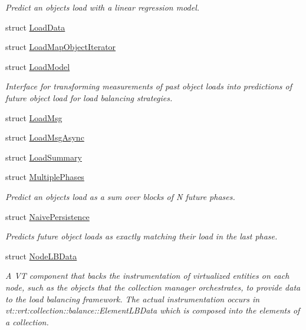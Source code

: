 \begin{DoxyCompactItemize}
\begin{DoxyCompactList}\small\item\em Predict an object\textquotesingle{}s load with a linear regression model. \end{DoxyCompactList}\item 
struct \hyperlink{structvt_1_1vrt_1_1collection_1_1balance_1_1_load_data}{Load\+Data}
\item 
struct \hyperlink{structvt_1_1vrt_1_1collection_1_1balance_1_1_load_map_object_iterator}{Load\+Map\+Object\+Iterator}
\item 
struct \hyperlink{structvt_1_1vrt_1_1collection_1_1balance_1_1_load_model}{Load\+Model}
\begin{DoxyCompactList}\small\item\em Interface for transforming measurements of past object loads into predictions of future object load for load balancing strategies. \end{DoxyCompactList}\item 
struct \hyperlink{structvt_1_1vrt_1_1collection_1_1balance_1_1_load_msg}{Load\+Msg}
\item 
struct \hyperlink{structvt_1_1vrt_1_1collection_1_1balance_1_1_load_msg_async}{Load\+Msg\+Async}
\item 
struct \hyperlink{structvt_1_1vrt_1_1collection_1_1balance_1_1_load_summary}{Load\+Summary}
\item 
struct \hyperlink{structvt_1_1vrt_1_1collection_1_1balance_1_1_multiple_phases}{Multiple\+Phases}
\begin{DoxyCompactList}\small\item\em Predict an object\textquotesingle{}s load as a sum over blocks of N future phases. \end{DoxyCompactList}\item 
struct \hyperlink{structvt_1_1vrt_1_1collection_1_1balance_1_1_naive_persistence}{Naive\+Persistence}
\begin{DoxyCompactList}\small\item\em Predicts future object loads as exactly matching their load in the last phase. \end{DoxyCompactList}\item 
struct \hyperlink{structvt_1_1vrt_1_1collection_1_1balance_1_1_node_l_b_data}{Node\+L\+B\+Data}
\begin{DoxyCompactList}\small\item\em A VT component that backs the instrumentation of virtualized entities on each node, such as the objects that the collection manager orchestrates, to provide data to the load balancing framework. The actual instrumentation occurs in {\ttfamily vt\+::vrt\+:collection\+:}\+:balance\+::\+Element\+L\+B\+Data which is composed into the elements of a collection. \end{DoxyCompactList}\item 

\end{DoxyCompactItemize}
